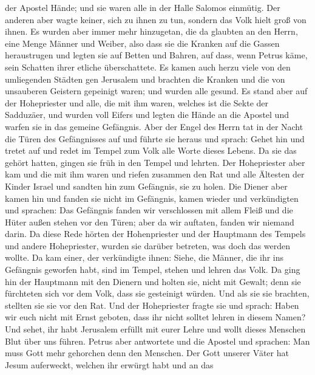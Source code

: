 der Apostel Hände; und sie waren alle in der Halle Salomos einmütig.
 Der anderen aber wagte keiner, sich zu ihnen zu tun,
sondern das Volk hielt groß von ihnen.  Es wurden aber
immer mehr hinzugetan, die da glaubten an den Herrn, eine Menge Männer
und Weiber,  also dass sie die Kranken auf die Gassen
heraustrugen und legten sie auf Betten und Bahren, auf dass, wenn Petrus
käme, sein Schatten ihrer etliche überschattete.  Es kamen
auch herzu viele von den umliegenden Städten gen Jerusalem und brachten
die Kranken und die von unsauberen Geistern gepeinigt waren; und wurden
alle gesund.  Es stand aber auf der Hohepriester und alle,
die mit ihm waren, welches ist die Sekte der Sadduzäer, und wurden voll
Eifers  und legten die Hände an die Apostel und warfen sie
in das gemeine Gefängnis.  Aber der Engel des Herrn tat in
der Nacht die Türen des Gefängnisses auf und führte sie heraus und
sprach:  Gehet hin und tretet auf und redet im Tempel zum
Volk alle Worte dieses Lebens.  Da sie das gehört hatten,
gingen sie früh in den Tempel und lehrten. Der Hohepriester aber kam und
die mit ihm waren und riefen zusammen den Rat und alle Ältesten der
Kinder Israel und sandten hin zum Gefängnis, sie zu holen. 
Die Diener aber kamen hin und fanden sie nicht im Gefängnis, kamen
wieder und verkündigten  und sprachen: Das Gefängnis fanden
wir verschlossen mit allem Fleiß und die Hüter außen stehen vor den
Türen; aber da wir auftaten, fanden wir niemand darin.  Da
diese Rede hörten der Hohenpriester und der Hauptmann des Tempels und
andere Hohepriester, wurden sie darüber betreten, was doch das werden
wollte.  Da kam einer, der verkündigte ihnen: Siehe, die
Männer, die ihr ins Gefängnis geworfen habt, sind im Tempel, stehen und
lehren das Volk.  Da ging hin der Hauptmann mit den Dienern
und holten sie, nicht mit Gewalt; denn sie fürchteten sich vor dem Volk,
dass sie gesteinigt würden.  Und als sie sie brachten,
stellten sie sie vor den Rat. Und der Hohepriester fragte sie
 und sprach: Haben wir euch nicht mit Ernst geboten, dass
ihr nicht solltet lehren in diesem Namen? Und sehet, ihr habt Jerusalem
erfüllt mit eurer Lehre und wollt dieses Menschen Blut über uns führen.
 Petrus aber antwortete und die Apostel und sprachen: Man
muss Gott mehr gehorchen denn den Menschen.  Der Gott
unserer Väter hat Jesum auferweckt, welchen ihr erwürgt habt und an das
